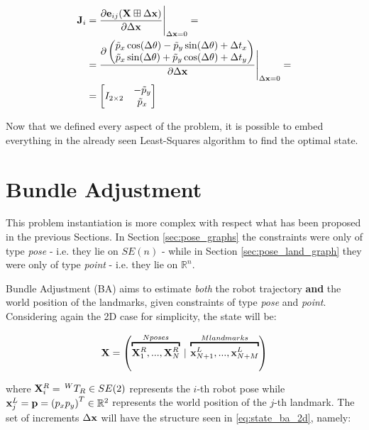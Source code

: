 \begin{align}
    \mathbf{J}_i &= \frac{\partial \mathbf{e}_{ij}(\mathbf{X} \boxplus \Delta \mathbf{x})}{\partial \Delta \mathbf{x}} \Bigg \rvert_{\Delta \mathbf{x} = 0} = \nonumber \\
    &= \frac{\partial\begin{pmatrix}
            \tilde{p}_x\cos(\Delta\theta) - \tilde{p}_y\sin(\Delta\theta) + \Delta t_x \\
            \tilde{p}_x\sin(\Delta\theta) + \tilde{p}_y\cos(\Delta\theta) + \Delta t_y
        \end{pmatrix}}{\partial\Delta \mathbf{x}} \Bigg \rvert_{\Delta \mathbf{x} = 0} = \nonumber \\
    &= \begin{bmatrix}
            I_{2 \times 2} & \begin{matrix} -\tilde{p}_y \\ \tilde{p}_x\end{matrix}
    \end{bmatrix}
    \label{eq:jacobian_r2}
\end{align}

Now that we defined every aspect of the problem, it is possible to embed everything in the already seen Least-Squares algorithm to find the optimal state.

\section{Bundle Adjustment}\label{sec:bundle_adjustment_problem}
This problem instantiation is more complex with respect what has been proposed in the previous Sections. In Section \ref{sec:pose_graphs} the constraints were only of type \textit{pose} - i.e. they lie on $SE(n)$ - while in Section \ref{sec:pose_land_graph} they were only of type \textit{point} - i.e. they lie on $\mathbb{R}^n$.

Bundle Adjustment (BA) aims to estimate \textit{both} the robot trajectory \textbf{and} the world position of the landmarks, given constraints of type \textit{pose} and \textit{point}. Considering again the 2D case for simplicity, the state will be:

\begin{equation}
    \SState = \left(\overbracket{\SState^R_1, ..., \SState^R_N}^{N poses}\: |\: \overbracket{\state^L_{N+1}, ..., \state^L_{N+M}}^{M landmarks}\right)
    \label{eq:state_ba_2d}
\end{equation}

\noindent where $\mathbf{X}^R_i = \,^{W}T_{R} \in SE(2)$ represents the $i$-th robot pose while $\mathbf{x}^L_j = \mathbf{p} = \left(p_x p_y\right)^T \in \mathbb{R}^2$ represents the world position of the $j$-th landmark. The set of increments $\Delta \mathbf{x}$ will have the structure seen in \ref{eq:state_ba_2d}, namely:

